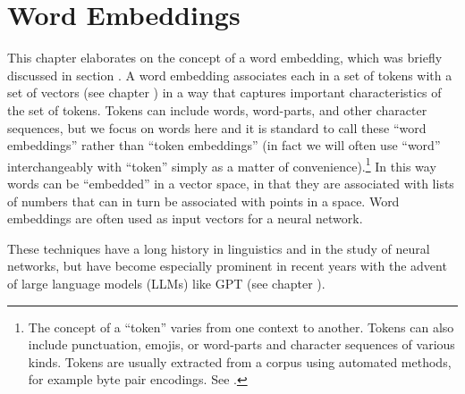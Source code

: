 \chapter{Word Embeddings}\label{ch_word_embeddings}


This chapter elaborates on the concept of a word embedding, which was briefly discussed in section . A word embedding associates each  in a set of tokens with a set of vectors (see chapter ) in a way that captures important characteristics of the set of tokens. Tokens can include words, word-parts, and other character sequences, but we focus on words here and it is standard to call these ``word embeddings'' rather than ``token embeddings'' (in fact we will often use ``word'' interchangeably with ``token'' simply as a matter of convenience).\footnote{The concept of a ``token'' varies from one context to another. Tokens can also include punctuation, emojis, or word-parts and character sequences of various kinds. Tokens are usually extracted from a corpus using automated methods, for example byte pair encodings. See .} In this way words can be ``embedded'' in a vector space, in that they are associated with lists of numbers that can in turn be associated with points in a space. Word embeddings are often used as input vectors for a neural network.

These techniques have a long history in linguistics and in the study of neural networks, but have become especially prominent in recent years with the advent of large language models (LLMs) like GPT (see chapter ).

